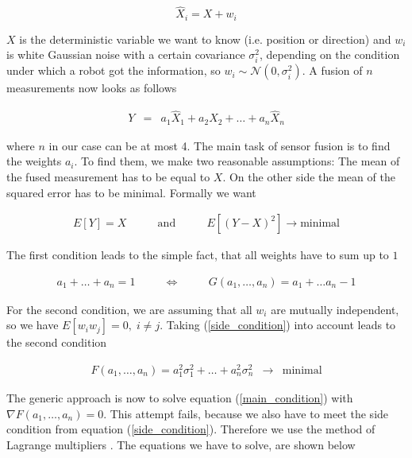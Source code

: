 	\[ %
    			\hat{X}_{i} = X + w_i
	\]

\(X\) is the deterministic variable we want to know (i.e. position or direction) and \(w_i\) is white Gaussian noise with a certain covariance \(\sigma_i^2\), depending on the condition under which a robot got the information, so \(w_i \sim \mathcal{N}(0,\sigma_i^2)\). A fusion of \(n\) measurements now looks as follows

	\begin{eqnarray}\label{fusion}
    			 Y &=& a_1 \hat{X}_{1} + a_2 \hat{X}_{2} + \ldots + a_n \hat{X}_{n}
	\end{eqnarray}

where \(n\) in our case can be at most 4. The main task of sensor fusion is to find the weights \(a_i\). To find them, we make two reasonable assumptions: The mean of the fused measurement has to be equal to \(X\). On the other side the mean of the squared error has to be minimal. Formally we want

	\begin{eqnarray}\label{assumptions}
    			 E[Y] = X \qquad  &\mathrm{and}& \qquad E\left[ (Y-X)^2 \right] \rightarrow 						\mathrm{minimal} 
	\end{eqnarray}

The first condition leads to the simple fact, that all weights have to sum up to \(1\)

	\begin{eqnarray}\label{side_condition}
    			 a_1 + \ldots + a_n = 1 \qquad &\Longleftrightarrow& \qquad G(a_1, \ldots, a_n) = a_1 +   				\ldots a_n - 1
	\end{eqnarray}

For the second condition, we are assuming that all \(w_i\) are mutually independent, so we have \(E[w_i w_j] = 0, \; i \neq j\). Taking (\ref{side_condition}) into account leads to the second condition

	\begin{eqnarray}\label{main_condition}
    			 F(a_1,\ldots,a_n) = a_1^2\sigma_1^2 + \ldots + a_n^2 \sigma_n^2 &\rightarrow&  					\mathrm{minimal}
	\end{eqnarray}

The generic approach is now to solve equation (\ref{main_condition}) with \(\nabla F(a_1,\ldots,a_n) = 0\). This attempt fails, because we also have to meet the side condition from equation (\ref{side_condition}). Therefore we use the method of Lagrange multipliers \cite{Blatter}. The equations we have to solve, are shown below


